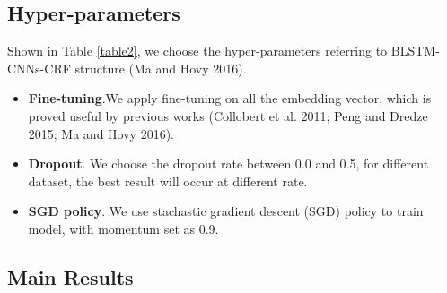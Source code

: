 \documentclass[letterpaper]{article} %
\begin{document}
\subsection{Hyper-parameters}

\begin{table}[t]
\caption{Hyperparameters}\smallskip
\centering
{}
\label{table2}
\end{table}

Shown in Table \ref{table2}, we choose the hyper-parameters referring to BLSTM-CNNs-CRF structure (Ma and Hovy 2016). 

\begin{itemize}
\item \textbf{Fine-tuning}.We apply fine-tuning on all the embedding vector, which is proved useful by previous works (Collobert et al. 2011; Peng and Dredze 2015; Ma and Hovy 2016). 
\item \textbf{Dropout}. We choose the dropout rate between 0.0 and 0.5, for different dataset, the best result will occur at different rate.
\item \textbf{SGD policy}. We use stachastic gradient descent (SGD) policy to train model, with momentum set as 0.9.
\end{itemize}

\subsection{Main Results}
\end{document}
